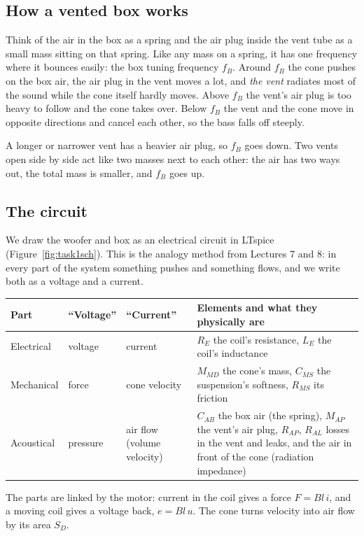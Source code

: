 \documentclass[a4paper,10pt]{article}
\begin{document}
\subsection{How a vented box works}
Think of the air in the box as a spring and the air plug inside the vent tube as a small mass sitting
on that spring. Like any mass on a spring, it has one frequency where it bounces easily: the box
tuning frequency $f_B$. Around $f_B$ the cone pushes on the box air, the air plug in the vent moves
a lot, and \emph{the vent} radiates most of the sound while the cone itself hardly moves. Above
$f_B$ the vent's air plug is too heavy to follow and the cone takes over. Below $f_B$ the vent and the
cone move in opposite directions and cancel each other, so the bass falls off steeply.

A longer or narrower vent has a heavier air plug, so $f_B$ goes down. Two vents open side by side act
like two masses next to each other: the air has two ways out, the total mass is smaller, and $f_B$
goes up.

\subsection{The circuit}
We draw the woofer and box as an electrical circuit in LTspice (Figure~\ref{fig:task1sch}). This is
the analogy method from Lectures 7 and 8: in every part of the system something pushes and something
flows, and we write both as a voltage and a current.
\begin{center}
\begin{tabularx}{\linewidth}{lllX}
\toprule
Part & ``Voltage'' & ``Current'' & Elements and what they physically are \\
\midrule
Electrical & voltage & current & $R_E$ the coil's resistance, $L_E$ the coil's inductance \\
Mechanical & force & cone velocity & $M_{MD}$ the cone's mass, $C_{MS}$ the suspension's softness, $R_{MS}$ its friction \\
Acoustical & pressure & air flow (volume velocity) & $C_{AB}$ the box air (the spring), $M_{AP}$ the vent's air plug, $R_{AP}$, $R_{AL}$ losses in the vent and leaks, and the air in front of the cone (radiation impedance) \\
\bottomrule
\end{tabularx}
\end{center}
The parts are linked by the motor: current in the coil gives a force $F = Bl\,i$, and a moving coil
gives a voltage back, $e = Bl\,u$. The cone turns velocity into air flow by its area $S_D$.
\end{document}

